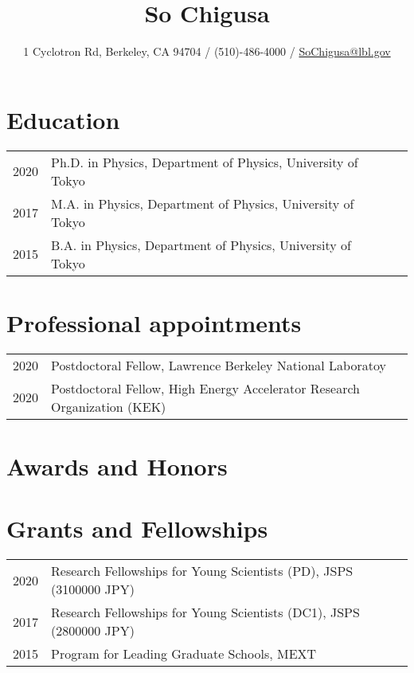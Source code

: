 \documentclass[12pt]{article}
\title{{\Large So Chigusa}}
\author{1 Cyclotron Rd, Berkeley, CA 94704 / (510)-486-4000 / \href{mailto:SoChigusa@lbl.gov}{SoChigusa@lbl.gov}}
\date{\vspace{-.5in}}
\begin{document}
\maketitle

\section*{Education}
\begin{table}[h]
 \begin{tabular}{llll}
  2020 & Ph.D. in Physics, Department of Physics, University of Tokyo \\
  2017 & M.A. in Physics, Department of Physics, University of Tokyo \\
  2015 & B.A. in Physics, Department of Physics, University of Tokyo
 \end{tabular}
\end{table}

\section*{Professional appointments}
\begin{table}[h]
  \begin{tabular}{ll}
    2020 & Postdoctoral Fellow, Lawrence Berkeley National Laboratoy \\
    2020 & Postdoctoral Fellow, High Energy Accelerator Research Organization (KEK)
  \end{tabular}
\end{table}

\section*{Awards and Honors}

\section*{Grants and Fellowships}
\begin{table}[H]
  \begin{tabular}{ll}
    2020 & Research Fellowships for Young Scientists (PD), JSPS (3100000 JPY) \\
    2017 & Research Fellowships for Young Scientists (DC1), JSPS (2800000 JPY) \\
    2015 & Program for Leading Graduate Schools, MEXT
  \end{tabular}
\end{table}
\end{document}
